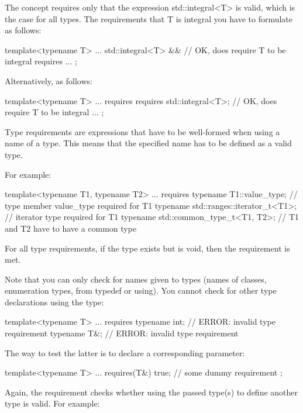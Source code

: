 The concept requires only that the expression std::integral<T> is valid, which is the case for all types. The requirements that T is integral you have to formulate as follows:

\begin{cpp}
template<typename T>
... std::integral<T> && // OK, does require T to be integral
	requires {
		...
	};
\end{cpp}

Alternatively, as follows:

\begin{cpp}
template<typename T>
... requires {
		requires std::integral<T>; // OK, does require T to be integral
		...
	};
\end{cpp}


Type requirements are expressions that have to be well-formed when using a name of a type. This means that the specified name has to be defined as a valid type.

For example:

\begin{cpp}
template<typename T1, typename T2>
... requires {
	typename T1::value_type; // type member value_type required for T1
	typename std::ranges::iterator_t<T1>; // iterator type required for T1
	typename std::common_type_t<T1, T2>; // T1 and T2 have to have a common type
}
\end{cpp}

For all type requirements, if the type exists but is void, then the requirement is met.

Note that you can only check for names given to types (names of classes, enumeration types, from typedef or using). You cannot check for other type declarations using the type:

\begin{cpp}
template<typename T>
... requires {
	typename int; // ERROR: invalid type requirement
	typename T&; // ERROR: invalid type requirement
}
\end{cpp}

The way to test the latter is to declare a corresponding parameter:

\begin{cpp}
template<typename T>
... requires(T&) {
	true; // some dummy requirement
};
\end{cpp}

Again, the requirement checks whether using the passed type(s) to define another type is valid. For example:

